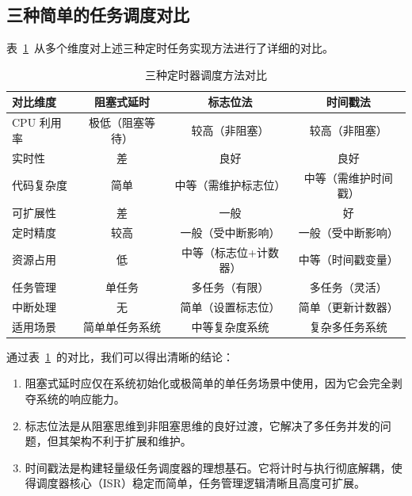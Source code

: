 \subsection{三种简单的任务调度对比}

表~\ref{tab:sched-compare}~从多个维度对上述三种定时任务实现方法进行了详细的对比。

\begin{table}[htbp]
\centering \caption{三种定时器调度方法对比} \label{tab:sched-compare}
    \begin{tabular}{lccc}
        \toprule
        对比维度 & 阻塞式延时 & 标志位法 & 时间戳法 \\
        \midrule
        CPU 利用率    & 极低（阻塞等待）   & 较高（非阻塞）     & 较高（非阻塞） \\
        实时性         & 差               & 良好              & 良好 \\
        代码复杂度     & 简单             & 中等（需维护标志位） & 中等（需维护时间戳） \\
        可扩展性       & 差               & 一般              & 好 \\
        定时精度       & 较高             & 一般（受中断影响）  & 一般（受中断影响） \\
        资源占用       & 低               & 中等（标志位+计数器） & 中等（时间戳变量） \\
        任务管理       & 单任务           & 多任务（有限）      & 多任务（灵活） \\
        中断处理       & 无               & 简单（设置标志位）  & 简单（更新计数器） \\
        适用场景       & 简单单任务系统    & 中等复杂度系统      & 复杂多任务系统 \\
        \bottomrule
    \end{tabular}
\end{table}

通过表~\ref{tab:sched-compare}~的对比，我们可以得出清晰的结论：

\begin{enumerate}
\item 阻塞式延时应仅在系统初始化或极简单的单任务场景中使用，因为它会完全剥夺系统的响应能力。
\item 标志位法是从阻塞思维到非阻塞思维的良好过渡，它解决了多任务并发的问题，但其架构不利于扩展和维护。
\item 时间戳法是构建轻量级任务调度器的理想基石。它将计时与执行彻底解耦，使得调度器核心（ISR）稳定而简单，任务管理逻辑清晰且高度可扩展。
\end{enumerate}

